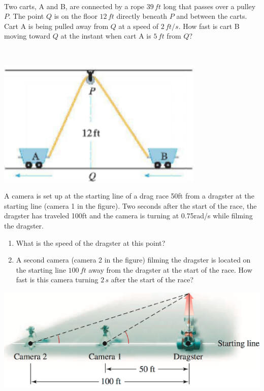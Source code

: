 \documentclass[mathNotesPreamble]{subfiles}
\begin{document}
\noindent
\begin{minipage}[t]{0.7\linewidth}~
  \begin{ex*}
  Two carts, A and B, are connected by a rope $39\,ft$ long that passes over a pulley $P$. The point $Q$ is on the floor $12\,ft$ directly beneath $P$ and between the carts.  Cart A is being pulled away from $Q$ at  a speed of $2\,ft/s$.  How fast is cart B moving toward $Q$ at the instant when cart A is $5\,ft$ from $Q$?
\end{ex*}
\end{minipage}%
\begin{minipage}[t]{0.3\linewidth}~
  \begin{flushright}
    \vspace*{7.5pt}
    \includegraphics[width=0.9\linewidth]{images/briggs_03_11/cart.png}
  \end{flushright}
\end{minipage}%
\pagebreak

\begin{ex*}
   A camera is set up at the starting line of a drag race 50ft from a dragster at the starting line (camera 1 in the figure). Two seconds after the start of the race, the dragster has traveled 100ft and the camera is turning at 0.75rad/s while filming the dragster.
  \begin{enumerate}[label=\alph*)]
    \item What is the speed of the dragster at this point?
    \item A second camera (camera 2 in the figure) filming the dragster is located on the starting line $100\,ft$ away from the dragster at the start of the race. How fast is this camera turning $2\,s$ after the start of the race?
  \end{enumerate}
\end{ex*}
\vspace*{-20pt}
\begin{flushright}
  \includegraphics[width=0.5\linewidth]{images/briggs_03_11/dragrace.png}
\end{flushright}
\pagebreak
\end{document}
